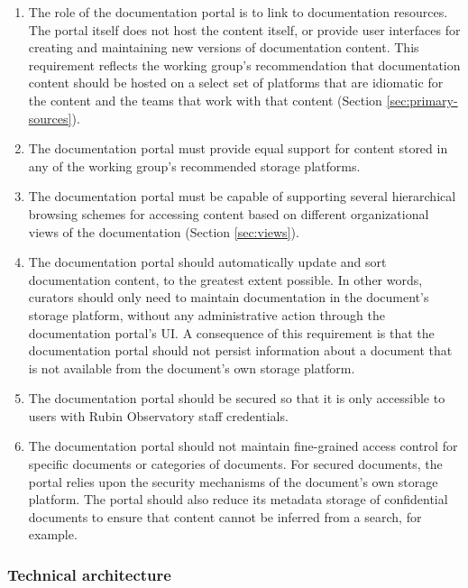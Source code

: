 \begin{enumerate}
  \item The role of the documentation portal is to link to documentation resources. The portal itself does not host the content itself, or provide user interfaces for creating and maintaining new versions of documentation content. This requirement reflects the working group's recommendation that documentation content should be hosted on a select set of platforms that are idiomatic for the content and the teams that work with that content (Section \ref{sec:primary-sources}).

  \item The documentation portal must provide equal support for content stored in any of the working group's recommended storage platforms.

  \item The documentation portal must be capable of supporting several hierarchical browsing schemes for accessing content based on different organizational views of the documentation (Section \ref{sec:views}).

  \item The documentation portal should automatically update and sort documentation content, to the greatest extent possible. In other words, curators should only need to maintain documentation in the document's storage platform, without any administrative action through the documentation portal's UI. A consequence of this requirement is that the documentation portal should not persist information about a document that is not available from the document's own storage platform.

  \item The documentation portal should be secured so that it is only accessible to users with Rubin Observatory staff credentials.

  \item The documentation portal should not maintain fine-grained access control for specific documents or categories of documents. For secured documents, the portal relies upon the security mechanisms of the document's own storage platform. The portal should also reduce its metadata storage of confidential documents to ensure that content cannot be inferred from a search, for example.
\end{enumerate}

\subsubsection{Technical architecture}

